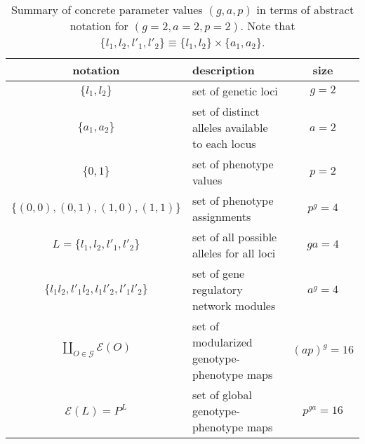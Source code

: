 \begin{table}
\centering
\begin{tabular}{ c | l | c }
	\textbf{notation} & \textbf{description} & \textbf{size}\\ \hline \hline
	$\{l_1,l_2\}$ & set of genetic loci & $g = 2$\\ \hline
	$\{a_1,a_2\}$ & set of distinct alleles available to each locus & $a = 2$\\ \hline
	$\{0,1\}$ & set of phenotype values & $p = 2$\\ \hline
	$\{(0,0),(0,1),(1,0),(1,1)\}$ & set of phenotype assignments & $p^g = 4$\\ \hline
	$L = \{l_1,l_2,l'_1,l'_2\}$ & set of all possible alleles for all loci & $ga = 4$\\ \hline
	$\{l_1 l_2,l'_1 l_2,l_1 l'_2,l'_1 l'_2\}$ & set of gene regulatory network modules & $a^g = 4$\\ \hline
$\coprod_{O \in \mathcal{G}} \mathcal{E}(O)$ & set of modularized genotype-phenotype maps  & $(ap)^g = 16$\\ \hline
	$\mathcal{E}(L) = P^L$ & set of global genotype-phenotype maps & $p^{ga} = 16$\\
    \end{tabular}
\caption{Summary of concrete parameter values $(g,a,p)$ in terms of abstract notation for $(g=2,a=2,p=2)$. Note that $\{l_1,l_2,l'_1,l'_2\} \equiv \{l_1,l_2\} \times \{a_1,a_2\}$.}
\label{tab:pars222}
\end{table}